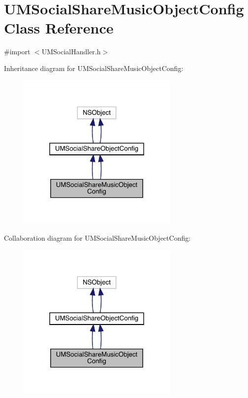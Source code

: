 \hypertarget{interface_u_m_social_share_music_object_config}{}\section{U\+M\+Social\+Share\+Music\+Object\+Config Class Reference}
\label{interface_u_m_social_share_music_object_config}


{\ttfamily \#import $<$U\+M\+Social\+Handler.\+h$>$}



Inheritance diagram for U\+M\+Social\+Share\+Music\+Object\+Config\+:\nopagebreak
\begin{figure}[H]
\begin{center}
\leavevmode
\includegraphics[width=223pt]{interface_u_m_social_share_music_object_config__inherit__graph}
\end{center}
\end{figure}


Collaboration diagram for U\+M\+Social\+Share\+Music\+Object\+Config\+:\nopagebreak
\begin{figure}[H]
\begin{center}
\leavevmode
\includegraphics[width=223pt]{interface_u_m_social_share_music_object_config__coll__graph}
\end{center}
\end{figure}
